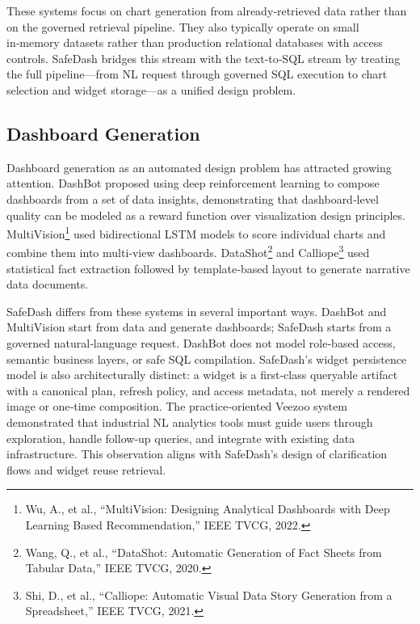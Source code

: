 \documentclass[11pt]{article}
\begin{document}
These systems focus on chart generation from already‑retrieved data rather than on the governed retrieval pipeline. They also typically operate on small in‑memory datasets rather than production relational databases with access controls. SafeDash bridges this stream with the text‑to‑SQL stream by treating the full pipeline—from NL request through governed SQL execution to chart selection and widget storage—as a unified design problem.

\subsection{Dashboard Generation}
Dashboard generation as an automated design problem has attracted growing attention. DashBot\cite{deng2023dashbot} proposed using deep reinforcement learning to compose dashboards from a set of data insights, demonstrating that dashboard‑level quality can be modeled as a reward function over visualization design principles. MultiVision\footnote{Wu, A., et al., ``MultiVision: Designing Analytical Dashboards with Deep Learning Based Recommendation,'' IEEE TVCG, 2022.} used bidirectional LSTM models to score individual charts and combine them into multi‑view dashboards. DataShot\footnote{Wang, Q., et al., ``DataShot: Automatic Generation of Fact Sheets from Tabular Data,'' IEEE TVCG, 2020.} and Calliope\footnote{Shi, D., et al., ``Calliope: Automatic Visual Data Story Generation from a Spreadsheet,'' IEEE TVCG, 2021.} used statistical fact extraction followed by template‑based layout to generate narrative data documents.

SafeDash differs from these systems in several important ways. DashBot and MultiVision start from data and generate dashboards; SafeDash starts from a governed natural‑language request. DashBot does not model role‑based access, semantic business layers, or safe SQL compilation. SafeDash's widget persistence model is also architecturally distinct: a widget is a first‑class queryable artifact with a canonical plan, refresh policy, and access metadata, not merely a rendered image or one‑time composition. The practice‑oriented Veezoo system~\cite{lehmann2022building} demonstrated that industrial NL analytics tools must guide users through exploration, handle follow‑up queries, and integrate with existing data infrastructure. This observation aligns with SafeDash's design of clarification flows and widget reuse retrieval.
\end{document}
